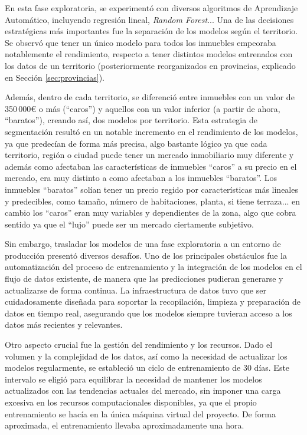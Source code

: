 En esta fase exploratoria, se experimentó con diversos algoritmos de Aprendizaje Automático, incluyendo regresión lineal, \textit{Random Forest}... Una de las decisiones estratégicas más importantes fue la separación de los modelos según el territorio. Se observó que tener un único modelo para todos los inmuebles empeoraba notablemente el rendimiento, respecto a tener distintos modelos entrenados con los datos de un territorio (posteriormente reorganizados en provincias, explicado en Sección \ref{sec:provincias}).

Además, dentro de cada territorio, se diferenció entre inmuebles con un valor de 350\,000€ o más (``caros'') y aquellos con un valor inferior (a partir de ahora, ``baratos''), creando así, dos modelos por territorio. Esta estrategia de segmentación resultó en un notable incremento en el rendimiento de los modelos, ya que predecían de forma más precisa, algo bastante lógico ya que cada territorio, región o ciudad puede tener un mercado inmobiliario muy diferente y además como afectaban las características de inmuebles ``caros'' a su precio en el mercado, era muy distinto a como afectaban a los inmuebles ``baratos''. Los inmuebles ``baratos'' solían tener un precio regido por características más lineales y predecibles, como tamaño, número de habitaciones, planta, si tiene terraza... en cambio los ``caros'' eran muy variables y dependientes de la zona, algo que cobra sentido ya que el ``lujo'' puede ser un mercado ciertamente subjetivo.

Sin embargo, trasladar los modelos de una fase exploratoria a un entorno de producción presentó diversos desafíos. Uno de los principales obstáculos fue la automatización del proceso de entrenamiento y la integración de los modelos en el flujo de datos existente, de manera que las predicciones pudieran generarse y actualizarse de forma continua. La infraestructura de datos tuvo que ser cuidadosamente diseñada para soportar la recopilación, limpieza y preparación de datos en tiempo real, asegurando que los modelos siempre tuvieran acceso a los datos más recientes y relevantes.

Otro aspecto crucial fue la gestión del rendimiento y los recursos. Dado el volumen y la complejidad de los datos, así como la necesidad de actualizar los modelos regularmente, se estableció un ciclo de entrenamiento de  30 días. Este intervalo se eligió para equilibrar la necesidad de mantener los modelos actualizados con las tendencias actuales del mercado, sin imponer una carga excesiva en los recursos computacionales disponibles, ya que el propio entrenamiento se hacía en la única máquina virtual del proyecto. De forma aproximada, el entrenamiento llevaba aproximadamente una hora.

